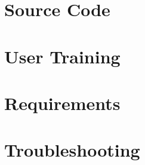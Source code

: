 \documentclass{simcenterdocumentation}
\begin{document}
\chapter{Source Code}
\label{chap:SourceCode}


\chapter{User Training}
\label{chap:training}


\chapter{Requirements}
\label{chap:requirements}


\chapter{Troubleshooting}
\label{chap:troubleshooting}


\nocite{*}

\pagestyle{plain}
{
  \renewcommand{\thispagestyle}[1]{}	
  \printbibliography           
}
\end{document}
